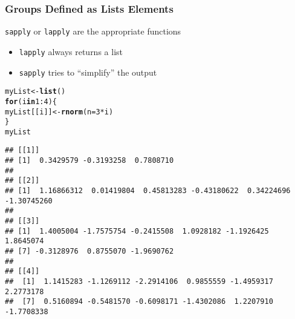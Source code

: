 \documentclass[paper=screen,mathserif]{beamer}\usepackage[]{graphicx}\usepackage[]{color}
\makeatletter
\newcommand{\hlnum}[1]{\textcolor[rgb]{0.686,0.059,0.569}{#1}}%
\newcommand{\hlopt}[1]{\textcolor[rgb]{0,0,0}{#1}}%
\newcommand{\hlstd}[1]{\textcolor[rgb]{0.345,0.345,0.345}{#1}}%
\newcommand{\hlkwa}[1]{\textcolor[rgb]{0.161,0.373,0.58}{\textbf{#1}}}%
\newcommand{\hlkwb}[1]{\textcolor[rgb]{0.69,0.353,0.396}{#1}}%
\newcommand{\hlkwc}[1]{\textcolor[rgb]{0.333,0.667,0.333}{#1}}%
\newcommand{\hlkwd}[1]{\textcolor[rgb]{0.737,0.353,0.396}{\textbf{#1}}}%
\newenvironment{kframe}{%
 \def\at@end@of@kframe{}%
 \ifinner\ifhmode%
  \def\at@end@of@kframe{\end{minipage}}%
  \begin{minipage}{\columnwidth}%
 \fi\fi%
 \def\FrameCommand##1{\hskip\@totalleftmargin \hskip-\fboxsep
 \colorbox{shadecolor}{##1}\hskip-\fboxsep
     \hskip-\linewidth \hskip-\@totalleftmargin \hskip\columnwidth}%
 \MakeFramed {\advance\hsize-\width
   \@totalleftmargin\z@ \linewidth\hsize
   \@setminipage}}%
 {\par\unskip\endMakeFramed%
 \at@end@of@kframe}
\newenvironment{knitrout}{}{} %
\newcommand{\ft}[1]{\frametitle{#1}}
\makeatother
\begin{document}
\begin{frame}[fragile]
  \ft{Groups Defined as Lists Elements}
  
  \verb=sapply= or \verb=lapply= are the appropriate functions
  \begin{itemize}
  \item \verb=lapply= always returns a list
  \item \verb=sapply= tries to ``simplify'' the output
  \end{itemize}
\pause
\begin{knitrout}\scriptsize
{}\color{fgcolor}\begin{kframe}
\begin{alltt}
\hlstd{myList} \hlkwb{<-} \hlkwd{list}\hlstd{()}
\hlkwa{for} \hlstd{(i} \hlkwa{in} \hlnum{1}\hlopt{:}\hlnum{4}\hlstd{) \{}
    \hlstd{myList[[i]]} \hlkwb{<-} \hlkwd{rnorm}\hlstd{(}\hlkwc{n} \hlstd{=} \hlnum{3} \hlopt{*} \hlstd{i)}
\hlstd{\}}
\hlstd{myList}
\end{alltt}
\begin{verbatim}
## [[1]]
## [1]  0.3429579 -0.3193258  0.7808710
## 
## [[2]]
## [1]  1.16866312  0.01419804  0.45813283 -0.43180622  0.34224696 -1.30745260
## 
## [[3]]
## [1]  1.4005004 -1.7575754 -0.2415508  1.0928182 -1.1926425  1.8645074
## [7] -0.3128976  0.8755070 -1.9690762
## 
## [[4]]
##  [1]  1.1415283 -1.1269112 -2.2914106  0.9855559 -1.4959317  2.2773178
##  [7]  0.5160894 -0.5481570 -0.6098171 -1.4302086  1.2207910 -1.7708338
\end{verbatim}
\end{kframe}
\end{knitrout}

\end{frame}
\end{document}
